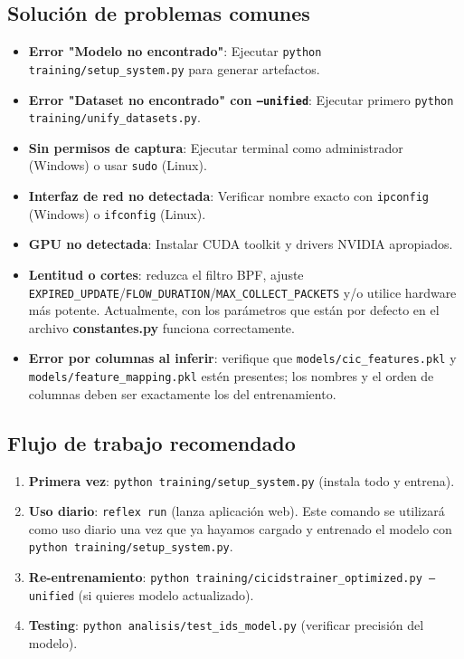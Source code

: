 \subsection*{Solución de problemas comunes}
\begin{itemize}
  \item \textbf{Error "Modelo no encontrado"}: Ejecutar \texttt{python training/setup\_system.py} para generar artefactos.
  \item \textbf{Error "Dataset no encontrado" con \texttt{--unified}}: Ejecutar primero \texttt{python training/unify\_datasets.py}.
  \item \textbf{Sin permisos de captura}: Ejecutar terminal como administrador (Windows) o usar \texttt{sudo} (Linux).
  \item \textbf{Interfaz de red no detectada}: Verificar nombre exacto con \texttt{ipconfig} (Windows) o \texttt{ifconfig} (Linux).
  \item \textbf{GPU no detectada}: Instalar CUDA toolkit y drivers NVIDIA apropiados.
  \item \textbf{Lentitud o cortes}: reduzca el filtro BPF, ajuste \texttt{EXPIRED\_UPDATE}/\texttt{FLOW\_DURATION}/\texttt{MAX\_COLLECT\_PACKETS} y/o utilice hardware más potente. Actualmente, con los parámetros que están por defecto en el archivo \textbf{constantes.py} funciona correctamente.
  \item \textbf{Error por columnas al inferir}: verifique que \texttt{models/cic\_features.pkl} y \texttt{models/feature\_mapping.pkl} estén presentes; los nombres y el orden de columnas deben ser exactamente los del entrenamiento.
\end{itemize}

\subsection*{Flujo de trabajo recomendado}
\begin{enumerate}
  \item \textbf{Primera vez}: \texttt{python training/setup\_system.py} (instala todo y entrena).
  \item \textbf{Uso diario}: \texttt{reflex run} (lanza aplicación web). Este comando se utilizará como uso diario una vez que ya hayamos cargado y entrenado el modelo con \texttt{python training/setup\_system.py}.
  \item \textbf{Re-entrenamiento}: \texttt{python training/cicidstrainer\_optimized.py --unified} (si quieres modelo actualizado).
  \item \textbf{Testing}: \texttt{python analisis/test\_ids\_model.py} (verificar precisión del modelo).
\end{enumerate}
